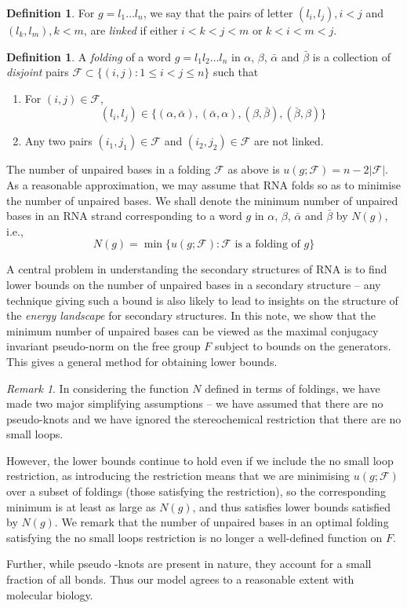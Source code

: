 \documentclass{amsart}
\theoremstyle{plain}
\theoremstyle{definition}
\newtheorem{definition}[theorem]{Definition}
\theoremstyle{remark}
\newtheorem{remark}[theorem]{Remark}
\newcommand{\F}{\mathcal{F}}
\renewcommand{\a}{\alpha}
\renewcommand{\b}{\beta}
\newcommand{\ba}{\bar{\alpha}}
\newcommand{\bb}{\bar{\beta}}
\begin{document}
\begin{definition}
For $g=l_1\dots l_n$, we say that the pairs of letter $(l_i,l_j),i<j$ and $(l_k,l_m), k<m$, are \emph{linked} if either $i<k<j<m$ or $k<i<m<j$.
\end{definition}

\begin{definition}\label{deffold}
A \emph{folding}  of a word $g=l_1l_2\dots l_n$ in $\a$, $\b$, $\ba$ and $\bb$ is a collection of
\emph{disjoint} pairs $\F\subset\{(i,j):1\leq i<j\leq n\}$
such that
\begin{enumerate}
\item For $(i,j)\in \F$, 
$$(l_i,l_j)\in\{(\a,\ba),(\ba,\a), (\b,\bb),(\bb,\b)\}$$ 
\item Any two pairs $(i_1,j_1)\in \F$ and $(i_2,j_2)\in\F$ are not linked.

\end{enumerate}
\end{definition}
The number of unpaired bases in a folding $\F$ as above is $u(g;\F)=n-2\vert \F\vert$. As a reasonable approximation, we may assume that RNA folds so as to minimise the number of unpaired bases. We shall denote the minimum number of unpaired bases in an RNA strand corresponding to a word $g$ in $\a$, $\b$, $\ba$ and $\bb$ by $N(g)$, i.e.,
$$N(g)=\min\{u(g;\F) : \text{$\F$ is a folding of $g$}\}$$

A central problem in understanding the secondary structures of RNA is to find lower bounds on the number of unpaired bases in a secondary structure -- any technique giving such a bound is also likely to lead to insights on the structure of the \emph{energy landscape} for secondary structures. In this note, we show that the minimum number of unpaired bases can be viewed as the maximal conjugacy invariant  pseudo-norm on the free group $F$ subject to bounds on the generators. This gives a general method for obtaining lower bounds.

\begin{remark}
In considering the function $N$ defined in terms of foldings, we have made two major simplifying assumptions -- we have assumed that there are no  pseudo-knots and we have ignored the stereochemical restriction that there are no small loops. 

However, the lower bounds continue to hold even if we include the no small loop restriction, as introducing the restriction means that we are minimising $u(g;\F)$ over a subset of foldings (those satisfying the restriction), so the corresponding minimum is at least as large as $N(g)$, and thus satisfies lower bounds satisfied by $N(g)$. We remark that the number of unpaired bases in an optimal folding satisfying the no small loops restriction is no longer a well-defined function on $F$.

Further, while  pseudo -knots are present in nature, they account for a small fraction of all bonds. Thus our model agrees to a reasonable extent with molecular biology.
\end{remark}
\end{document}

